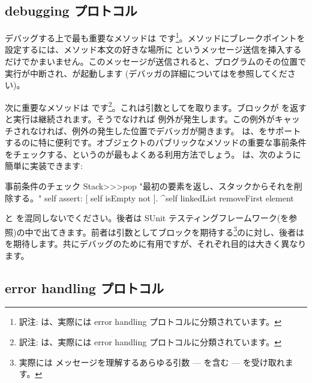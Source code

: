 \documentclass[a4paper,10pt,twoside]{book}
\begin{document}

\subsection{debugging プロトコル}

デバッグする上で最も重要なメソッドは  です\footnote{訳注:  は、実際には error handling プロトコルに分類されています。}。メソッドにブレークポイントを設定するには、メソッド本文の好きな場所に  というメッセージ送信を挿入するだけでかまいません。このメッセージが送信されると、プログラムのその位置で実行が中断され、が起動します
(デバッガの詳細についてはを参照してください)。


次に重要なメソッドは  です\footnote{訳注:  は、実際には error handling プロトコルに分類されています。}。これは引数としてを取ります。ブロックが  を返すと実行は継続されます。そうでなければ  例外が発生します。この例外がキャッチされなければ、例外の発生した位置でデバッガが開きます。 は、をサポートするのに特に便利です。オブジェクトのパブリックなメソッドの重要な事前条件をチェックする、というのが最もよくある利用方法でしょう。 は、次のように簡単に実装できます:%

\begin{method}{事前条件のチェック}
Stack>>>pop
    "最初の要素を返し、スタックからそれを削除する。"
    self assert: [ self isEmpty not ].
    ^self linkedList removeFirst element
\end{method}

 と  を混同しないでください。後者は SUnit テスティングフレームワーク(を参照)の中で出てきます。前者は引数としてブロックを期待する\footnote{実際には  メッセージを理解するあらゆる引数 ---  を含む --- を受け取れます。}のに対し、後者は  を期待します。共にデバッグのために有用ですが、それぞれ目的は大きく異なります。

\subsection{error handling プロトコル}
\end{document}
